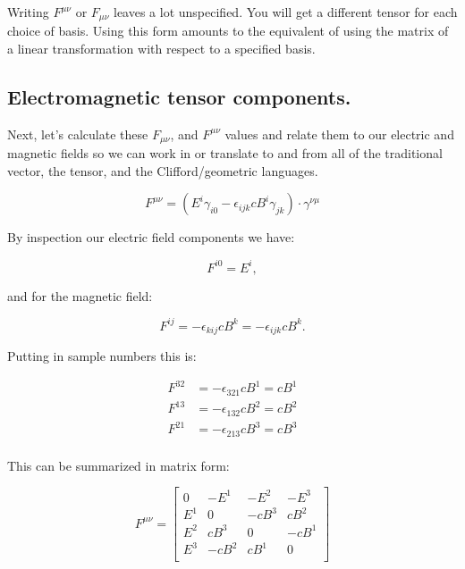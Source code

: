 Writing $F^{\mu\nu}$ or $F_{\mu\nu}$ leaves a lot unspecified.  You will get a different tensor for each choice of basis.  Using this form amounts to the equivalent of using the matrix of a linear transformation with respect to a specified basis.

\subsection{Electromagnetic tensor components. }

Next, let's calculate these
$F_{{\mu} {\nu}}$, and $F^{{\mu} {\nu}}$ values and relate them to our electric and magnetic fields so we can work in or translate to and from all of the traditional vector, the tensor, and the Clifford/geometric languages.

\begin{equation*}
F^{{\mu} {\nu}} = \left( E^i \gamma_{i 0} - \epsilon_{i j k} c B^i \gamma_{j k} \right) \cdot \gamma^{\nu\mu}
\end{equation*}

By inspection our electric field components we have:

\begin{equation*}
F^{i0} = E^i,
\end{equation*}

and for the magnetic field:

\begin{equation*}
F^{{i} {j}} = - \epsilon_{k i j} c B^k = - \epsilon_{i j k} c B^k.
\end{equation*}

Putting in sample numbers this is:

\begin{align*}
F^{{3} {2}} &= - \epsilon_{3 2 1} c B^1 = c B^1 \\
F^{{1} {3}} &= - \epsilon_{1 3 2} c B^2 = c B^2 \\
F^{{2} {1}} &= - \epsilon_{2 1 3} c B^3 = c B^3 \\
\end{align*}

This can be summarized in matrix form:

\begin{equation}\label{eqn:maxToTensor:matrixtensor}
F^{\mu\nu} =
\begin{bmatrix}
0   & -E^1 & -E^2 & -E^3 \\
E^1 &   0  & -c B^3 &  c B^2 \\
E^2 &  c B^3 &   0  & -c B^1 \\
E^3 & -c B^2 &  c B^1 &   0  \\
\end{bmatrix}
\end{equation}

